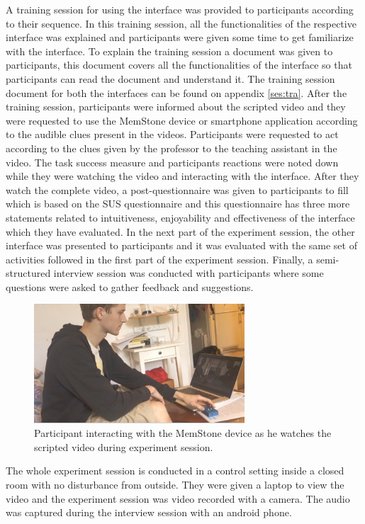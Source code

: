 \documentclass[mscthesis]{usiinfthesis}
\begin{document}
A training session for using the interface was provided to participants according to their sequence. In this training session, all the functionalities of the respective interface was explained and participants were given some time to get familiarize with the interface. To explain the training session a document was given to participants, this document covers all the functionalities of the interface so that participants can read the document and understand it. The training session document for both the interfaces can be found on appendix \ref{ses:tra}. After the training session, participants were informed about the scripted video and they were requested to use the MemStone device or smartphone application according to the audible clues present in the videos. Participants were requested to act according to the clues given by the professor to the teaching assistant in the video. The task success measure and participants reactions were noted down while they were watching the video and interacting with the interface. After they watch the complete video, a post-questionnaire was given to participants to fill which is based on the SUS questionnaire and this questionnaire has three more statements related to intuitiveness, enjoyability and effectiveness of the interface which they have evaluated. In the next part of the experiment session, the other interface was presented to participants and it was evaluated with the same set of activities followed in the first part of the experiment session. Finally, a semi-structured interview session was conducted with participants where some questions were asked to gather feedback and suggestions. 

\begin{figure}[!ht]
  \centering
  \includegraphics[width=0.7\textwidth]{Partic2}
  \caption{Participant interacting with the MemStone device as he watches the scripted video during experiment session.}
  \label{figp}
\end{figure}

The whole experiment session is conducted in a control setting inside a closed room with no disturbance from outside. They were given a laptop to view the video and the experiment session was video recorded with a camera. The audio was captured during the interview session with an android phone. 
\end{document}
